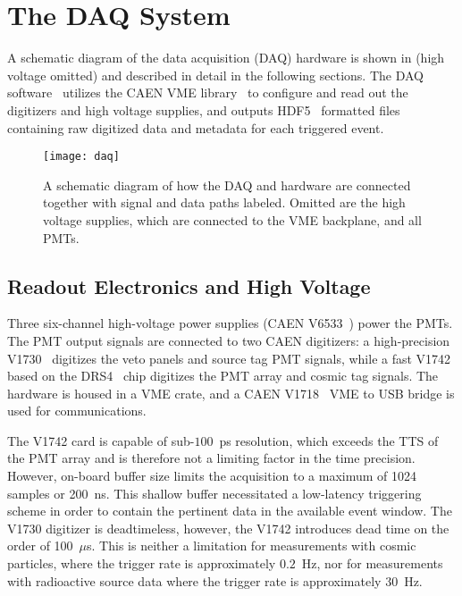 \section{The DAQ System \label{sec:daq}}

A schematic diagram of the data acquisition (DAQ) hardware is shown in   (high voltage omitted) and described in detail in the following sections. 
The DAQ software~\cite{wblsdaq} utilizes the CAEN VME library~\cite{caen-vme} to configure and read out the digitizers and high voltage supplies, and outputs HDF5~\cite{hdf5} formatted files containing raw digitized data and metadata for each triggered event.

\begin{figure}
\centering
\texttt{[image: daq]}
\caption{A schematic diagram of how the DAQ and hardware are connected together with signal and data paths labeled. Omitted are the high voltage supplies, which are connected to the VME backplane, and all PMTs.}
\label{fig:daq}
\end{figure}


\subsection{Readout Electronics and High Voltage}
Three six-channel high-voltage power supplies (CAEN V6533~\cite{v6533}) power the PMTs. 
The PMT output signals are connected to two CAEN digitizers: a high-precision V1730~\cite{v1730} digitizes the veto panels and source tag PMT signals, while a fast V1742~\cite{v1742} based on the DRS4~\cite{drs4} chip digitizes the PMT array and cosmic tag signals.  
The hardware is housed in a VME crate, and a CAEN V1718~\cite{v1718} VME to USB bridge is used for communications.  

The V1742 card is capable of sub-$100$~ps resolution, which exceeds the TTS of the PMT array and is therefore not a limiting factor in the time precision.  
However, on-board buffer size limits the acquisition to a maximum of 1024 samples or 200~ns. 
This shallow buffer necessitated a low-latency triggering scheme in order to contain the pertinent data in the available event window. 
The V1730 digitizer is deadtimeless, however, the V1742 introduces dead time on the order of 100~$\mu$s.  
This is neither a limitation for measurements with cosmic particles, where the trigger rate is approximately $0.2$~Hz, nor for measurements with radioactive source data where the trigger rate is approximately $30$~Hz.  

